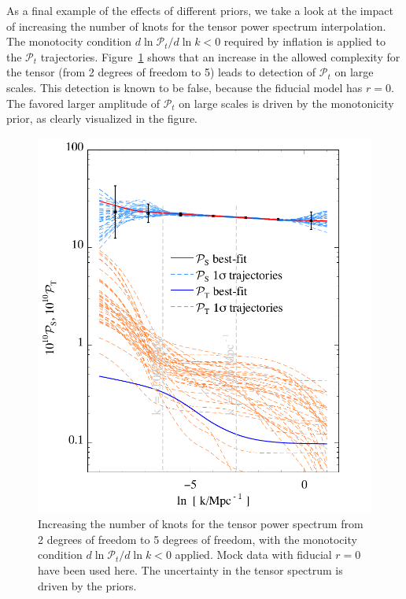 \documentclass[a4paper,11pt]{article}
\newcommand{\ptensor}{{\mathcal{P}_t}}
\begin{document}
As a final example of the effects of different priors, we take a look
at the impact of increasing the number of knots for the tensor power
spectrum interpolation. The monotocity condition $d\ln \ptensor/d\ln
k<0$ required by inflation is applied to the $\ptensor$ trajectories.
Figure~\ref{fig:7knot_Ps_5knot_Pt} shows that an increase in the
allowed complexity for the tensor (from 2 degrees of freedom to 5)
leads to detection of $\ptensor$ on large scales.  This detection is
known to be false, because the fiducial model has $r=0$.  The favored
larger amplitude of $\ptensor$ on large scales is driven by the
monotonicity prior, as clearly visualized in the figure.

\begin{figure}
  \includegraphics[width=0.9\linewidth]{fc_p7p5hermite_traj11}
  \caption{Increasing the number of knots for the tensor power
  spectrum from 2 degrees of freedom to 5 degrees of freedom, with the
  monotocity condition $d\ln \ptensor/d\ln k<0$ applied. Mock data
  with fiducial $r=0$ have been used here. The uncertainty in the
  tensor spectrum is driven by the priors.}
  \label{fig:7knot_Ps_5knot_Pt}
\end{figure}
\end{document}
